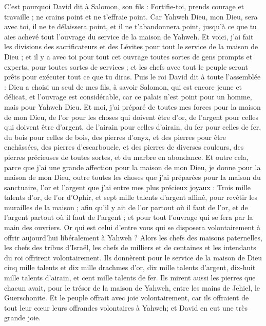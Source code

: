 \begin{multicols}{2}
C'est pourquoi David dit à Salomon, son fils : Fortifie-toi, prends courage et travaille ; ne crains point et ne t'effraie point. Car Yahweh Dieu, mon Dieu, sera avec toi, il ne te délaissera point, et il ne t'abandonnera point, jusqu'à ce que tu aies achevé tout l'ouvrage du service de la maison de Yahweh.
Et voici, j'ai fait les divisions des sacrificateurs et des Lévites pour tout le service de la maison de Dieu ; et il y a avec toi pour tout cet ouvrage toutes sortes de gens prompts et experts, pour toutes sortes de services ; et les chefs avec tout le peuple seront prêts pour exécuter tout ce que tu diras.
\VerseOne{}Puis le roi David dit à toute l'assemblée : Dieu a choisi un seul de mes fils, à savoir Salomon, qui est encore jeune et délicat, et l'ouvrage est considérable, car ce palais n'est point pour un homme, mais pour Yahweh Dieu.
Et moi, j'ai préparé de toutes mes forces pour la maison de mon Dieu, de l'or pour les choses qui doivent être d'or, de l'argent pour celles qui doivent être d'argent, de l'airain pour celles d'airain, du fer pour celles de fer, du bois pour celles de bois, des pierres d'onyx, et des pierres pour être enchâssées, des pierres d'escarboucle, et des pierres de diverses couleurs, des pierres précieuses de toutes sortes, et du marbre en abondance.
Et outre cela, parce que j'ai une grande affection pour la maison de mon Dieu, je donne pour la maison de mon Dieu, outre toutes les choses que j'ai préparées pour la maison du sanctuaire, l'or et l'argent que j'ai entre mes plus précieux joyaux :
Trois mille talents d'or, de l'or d'Ophir, et sept mille talents d'argent affiné, pour revêtir les murailles de la maison ;
afin qu'il y ait de l'or partout où il faut de l'or, et de l'argent partout où il faut de l'argent ; et pour tout l'ouvrage qui se fera par la main des ouvriers. Or qui est celui d'entre vous qui se disposera volontairement à offrir aujourd'hui libéralement à Yahweh ?
Alors les chefs des maisons paternelles, les chefs des tribus d'Israël, les chefs de milliers et de centaines et les intendants du roi offrirent volontairement.
Ils donnèrent pour le service de la maison de Dieu cinq mille talents et dix mille drachmes d'or, dix mille talents d'argent, dix-huit mille talents d'airain, et cent mille talents de fer.
Ils mirent aussi les pierres que chacun avait, pour le trésor de la maison de Yahweh, entre les mains de Jehiel, le Guerschonite.
Et le peuple offrait avec joie volontairement, car ils offraient de tout leur cœur leurs offrandes volontaires à Yahweh; et David en eut une très grande joie.

\end{multicols}
